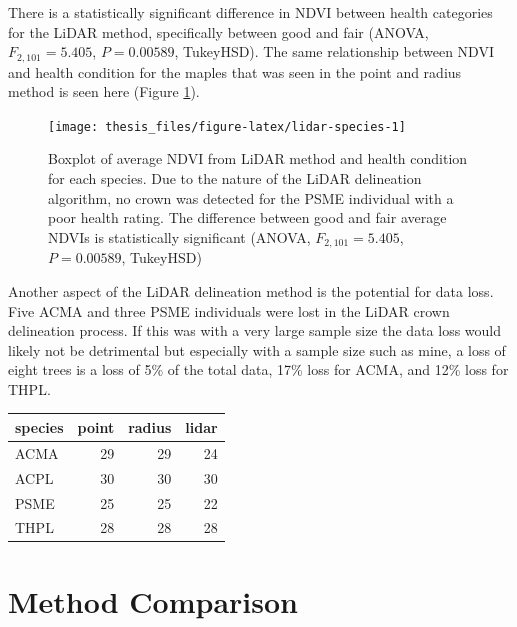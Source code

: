 \documentclass[12pt,twoside]{reedthesis}
\begin{document}
There is a statistically significant difference in NDVI between health categories for the LiDAR method, specifically between good and fair (ANOVA, \(F_{2,101} = 5.405\), \(P = 0.00589\), TukeyHSD). The same relationship between NDVI and health condition for the maples that was seen in the point and radius method is seen here (Figure \ref{fig:lidar-species}).
\begin{figure}
\texttt{[image: thesis\_files/figure-latex/lidar-species-1]} \caption[NDVI and health condition for LiDAR method]{Boxplot of average NDVI from LiDAR method and health condition for each species. Due to the nature of the LiDAR delineation algorithm, no crown was detected for the PSME individual with a poor health rating. The difference between good and fair average NDVIs is statistically significant (ANOVA, $F_{2,101} = 5.405$, $P = 0.00589$, TukeyHSD)}\label{fig:lidar-species}
\end{figure}
Another aspect of the LiDAR delineation method is the potential for data loss. Five ACMA and three PSME individuals were lost in the LiDAR crown delineation process. If this was with a very large sample size the data loss would likely not be detrimental but especially with a sample size such as mine, a loss of eight trees is a loss of 5\% of the total data, 17\% loss for ACMA, and 12\% loss for THPL.
\begin{tabular}{l|r|r|r}
\hline
species & point & radius & lidar\\
\hline
ACMA & 29 & 29 & 24\\
\hline
ACPL & 30 & 30 & 30\\
\hline
PSME & 25 & 25 & 22\\
\hline
THPL & 28 & 28 & 28\\
\hline
\end{tabular}
\hypertarget{method-comparison}{%
\section{Method Comparison}\label{method-comparison}}
\end{document}
